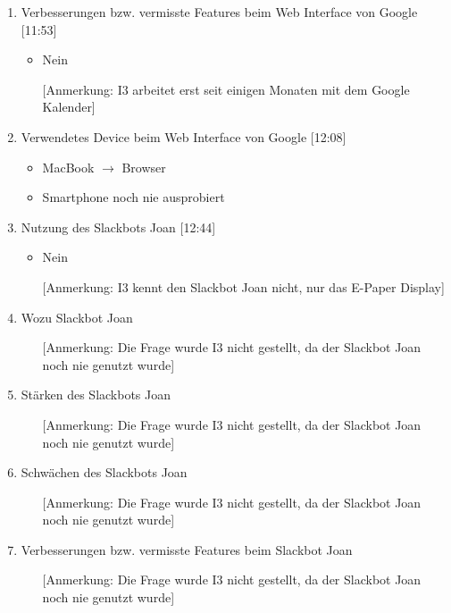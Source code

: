 \begin{enumerate}
    \item Verbesserungen bzw. vermisste Features beim Web Interface von Google [11:53]
     \begin{itemize}
        \item Nein
        \item[] [Anmerkung: I3 arbeitet erst seit einigen Monaten mit dem Google Kalender]
    \end{itemize}
    
    \item Verwendetes Device beim Web Interface von Google [12:08]
     \begin{itemize}
        \item MacBook $\rightarrow$ Browser 
        \item Smartphone noch nie ausprobiert
    \end{itemize}
    
    \item Nutzung des Slackbots Joan [12:44]
     \begin{itemize}
        \item Nein
        \item[] [Anmerkung: I3 kennt den Slackbot Joan nicht, nur das E-Paper Display]
    \end{itemize}
    
    \item Wozu Slackbot Joan
     \begin{itemize}
        \item[] [Anmerkung: Die Frage wurde I3 nicht gestellt, da der Slackbot Joan noch nie genutzt wurde]
    \end{itemize}
    
    \item Stärken des Slackbots Joan
     \begin{itemize}
        \item[] [Anmerkung: Die Frage wurde I3 nicht gestellt, da der Slackbot Joan noch nie genutzt wurde]
    \end{itemize}
    
    \item Schwächen des Slackbots Joan
     \begin{itemize}
        \item[] [Anmerkung: Die Frage wurde I3 nicht gestellt, da der Slackbot Joan noch nie genutzt wurde] 
    \end{itemize}
    
    \item Verbesserungen bzw. vermisste Features beim Slackbot Joan
     \begin{itemize}
        \item[] [Anmerkung: Die Frage wurde I3 nicht gestellt, da der Slackbot Joan noch nie genutzt wurde] 
    \end{itemize}
    

\end{enumerate}
